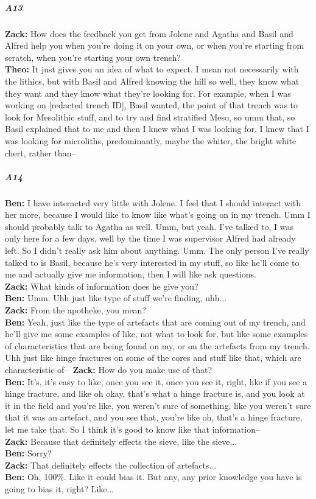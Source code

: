 \documentclass[
]{article}
\begin{document}
\subparagraph{A13}\label{sec-A13}

\textbf{Zack:} How does the feedback you get from Jolene and Agatha and
Basil and Alfred help you when you're doing it on your own, or when
you're starting from scratch, when you're starting your own trench?\\
\textbf{Theo:} It just gives you an idea of what to expect. I mean not
necessarily with the lithics, but with Basil and Alfred knowing the hill
so well, they know what they want and they know what they're looking
for. For example, when I was working on {[}redacted trench ID{]}, Basil
wanted, the point of that trench was to look for Mesolithic stuff, and
to try and find stratified Meso, so umm that, so Basil explained that to
me and then I knew what I was looking for. I knew that I was looking for
microliths, predominantly, maybe the whiter, the bright white chert,
rather than--

\subparagraph{A14}\label{sec-A14}

\textbf{Ben:} I have interacted very little with Jolene. I feel that I
should interact with her more, because I would like to know like what's
going on in my trench. Umm I should probably talk to Agatha as well.
Umm, but yeah. I've talked to, I was only here for a few days, well by
the time I was supervisor Alfred had already left. So I didn't really
ask him about anything. Umm. The only person I've really talked to is
Basil, because he's very interested in my stuff, so like he'll come to
me and actually give me information, then I will like ask questions.\\
\textbf{Zack:} What kinds of information does he give you?\\
\textbf{Ben:} Umm. Uhh just like type of stuff we're finding, uhh...\\
\textbf{Zack:} From the apotheke, you mean?\\
\textbf{Ben:} Yeah, just like the type of artefacts that are coming out
of my trench, and he'll give me some examples of like, not what to look
for, but like some examples of characteristics that are being found on
my, or on the artefacts from my trench. Uhh just like hinge fractures on
some of the cores and stuff like that, which are characteristic
of--~\textbf{Zack:} How do you make use of that?\\
\textbf{Ben:} It's, it's easy to like, once you see it, once you see it,
right, like if you see a hinge fracture, and like oh okay, that's what a
hinge fracture is, and you look at it in the field and you're like, you
weren't sure of something, like you weren't sure that it was an
artefact, and you see that, you're like oh, that's a hinge fracture, let
me take that. So I think it's good to know like that information--\\
\textbf{Zack:} Because that definitely effects the sieve, like the
sieve...\\
\textbf{Ben:} Sorry?\\
\textbf{Zack:} That definitely effects the collection of artefacts...\\
\textbf{Ben:} Oh, 100\%. Like it could bias it. But any, any prior
knowledge you have is going to bias it, right? Like...
\end{document}
